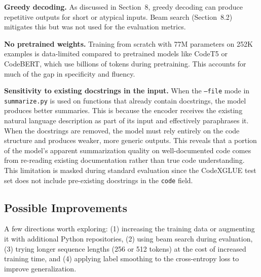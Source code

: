 \documentclass[11pt]{article}
\begin{document}
\textbf{Greedy decoding.} As discussed in Section~8, greedy decoding can produce repetitive outputs for short or atypical inputs. Beam search (Section~8.2) mitigates this but was not used for the evaluation metrics.

\textbf{No pretrained weights.} Training from scratch with 77M parameters on 252K examples is data-limited compared to pretrained models like CodeT5 or CodeBERT, which use billions of tokens during pretraining. This accounts for much of the gap in specificity and fluency.

\textbf{Sensitivity to existing docstrings in the input.} When the \texttt{--file} mode in \texttt{summarize.py} is used on functions that already contain docstrings, the model produces better summaries. This is because the encoder receives the existing natural language description as part of its input and effectively paraphrases it. When the docstrings are removed, the model must rely entirely on the code structure and produces weaker, more generic outputs. This reveals that a portion of the model's apparent summarization quality on well-documented code comes from re-reading existing documentation rather than true code understanding. This limitation is masked during standard evaluation since the CodeXGLUE test set does not include pre-existing docstrings in the \texttt{code} field.

\subsection{Possible Improvements}

A few directions worth exploring: (1) increasing the training data or augmenting it with additional Python repositories, (2) using beam search during evaluation, (3) trying longer sequence lengths (256 or 512 tokens) at the cost of increased training time, and (4) applying label smoothing to the cross-entropy loss to improve generalization.
\end{document}
